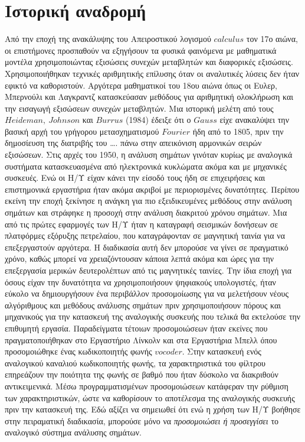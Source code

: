 \documentclass[breaklines=true, 12pt]{article}
\begin{document}
\section{Ιστορική αναδρομή}
\label{sec:orgcc6d2f8}
Από την εποχή της ανακάλυψης του Απειροστικού λογισμού \(calculus\)
τον 17ο αιώνα, οι επιστήμονες προσπαθούν να εξηγήσουν τα φυσικά
φαινόμενα με μαθηματικά μοντέλα χρησιμοποιώντας εξισώσεις
συνεχών μεταβλητών και διαφορικές εξισώσεις. Χρησιμοποιήθηκαν
τεχνικές αριθμητικής επίλυσης όταν οι αναλυτικές λύσεις δεν
ήταν εφικτό να καθοριστούν. Αργότερα μαθηματικοί του 18ου αιώνα
όπως οι Ευλερ, Μπερνούλι και Λαγκραντζ κατασκεύασαν μεθόδους
για αριθμητική ολοκλήρωση και την εισαγωγή εξισώσεων συνεχών
μεταβλητών. Μια ιστορική μελέτη από τους \(Heideman,\ Johnson\) και
\({Burrus}\) (1984) έδειξε ότι ο \({Gauss}\) είχε ανακαλύψει την βασική
αρχή του γρήγορου μετασχηματισμού \({Fourier}\) ήδη από το 1805, πριν
την δημοσίευση της διατριβής του \ldots{}. πάνω στην απεικόνιση
αρμονικών σειρών εξισώσεων.
Στις αρχές του 1950, η ανάλυση σημάτων γινόταν κυρίως με
αναλογικά συστήματα κατασκευασμένα από ηλεκτρονικά κυκλώματα
ακόμα και με μηχανικές συσκευές. Ενώ οι Η/Υ είχαν κάνει την
είσοδό τους ήδη σε επιχειρήσεις και επιστημονικά εργαστήρια
ήταν ακόμα ακριβοί με περιορισμένες δυνατότητες. Περίπου εκείνη
την εποχή ξεκίνησε η ανάγκη για πιο εξειδικευμένες μεθόδους
στην ανάλυση σημάτων και στράφηκε η προσοχή στην ανάλυση
διακριτού χρόνου σημάτων. Μια από τις πρώτες εφαρμογές των Η/Υ
ήταν η καταγραφή σεισμικών δονήσεων σε πλατφόρμες εξόρυξης
πετρελαίου, που καταγράφονταν σε μαγνητική ταινία για να επεξεργαστούν
αργότερα. Η διαδικασία αυτή δεν μπορούσε να γίνει σε
πραγματικό χρόνο, καθώς μπορεί να χρειαζόντουσαν κάποια
λεπτά ακόμα και ώρες για την επεξεργασία μερικών δευτερολέπτων
από τις μαγνητικές ταινίες.
    Την ίδια εποχή για όσους είχαν την δυνατότητα να χρησιμοποιήσουν
ψηφιακούς υπολογιστές, ήταν εύκολο να δημιουργήσουν ένα περιβάλλον
προσομοίωσης για να μελετήσουν νέους αλγόριθμους και μεθόδους
ανάλυσης σημάτων πριν χρησιμοποιήσουν πόρους και μηχανικούς για την
κατασκευή της αναλογικής συσκευής που τελικά θα εκτελούσε την
επιθυμητή εργασία. Παραδείγματα τέτοιων προσομοιώσεων ήταν εκείνες
που πραγματοποιήθηκαν στο Εργαστήριο Λίνκολν και στα Εργαστήρια Μπελλ
όπου προσομοιώθηκε ένας κωδικοποιητής φωνής \({vocoder}\). Στην κατασκευή
ενός αναλογικού καναλιού κωδικοποιητής φωνής, τα χαρακτηριστικά του
φίλτρου επηρεάζουν την ποιότητα της φωνής σε βαθμό που ήταν δύσκολο να
διακριθούν αντικειμενικά. Μέσω προγραμματισμένων προσομοιώσεων
κατάφεραν την ρύθμιση των χαρακτηριστικών, ώστε να καθορίσουν το
αποτέλεσμα της αναλογικής συσκευής πριν την κατασκευή της.
    Εδώ αξίζει να σημειωθεί ότι ενώ η χρήση των Η/Υ βοήθησε στην πειραματική
διαδικασία, μπορούσε μόνο να \emph{προσομοιώσει ή προσεγγίσει} το αναλογικό
σύστημα ανάλυσης σημάτων.
\end{document}
